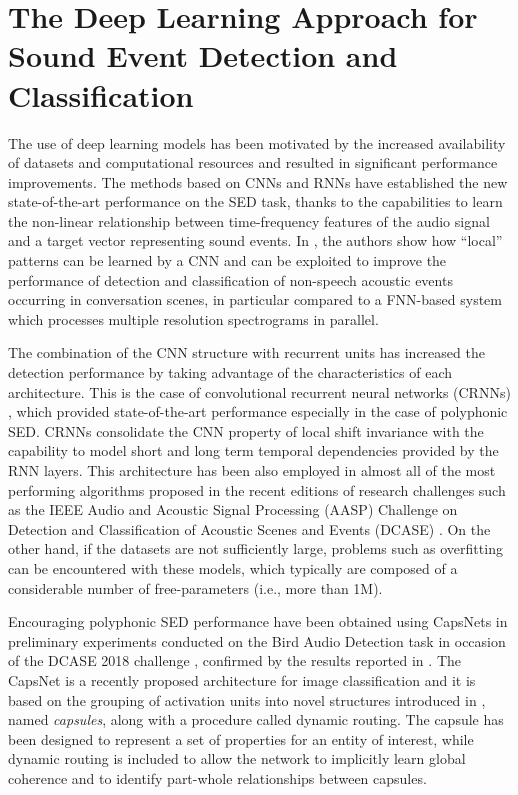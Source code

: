 \section{The Deep Learning Approach for Sound Event Detection and Classification}
The use of deep learning models has been motivated by the increased availability of datasets and computational resources and resulted in significant performance improvements. %
The methods based on CNNs and RNNs have established the new state-of-the-art performance on the SED task, thanks to the capabilities to learn the non-linear relationship between time-frequency features of the audio signal and a target vector representing sound events. In \cite{espi2015}, the authors show how ``local'' patterns can be learned by a CNN and can be exploited to improve the performance of detection and classification of non-speech acoustic events occurring in conversation scenes, in particular compared to a FNN-based system which processes multiple resolution spectrograms in parallel. 

The combination of the CNN structure with recurrent units has increased the detection performance by taking advantage of the characteristics of each architecture. This is the case of convolutional recurrent neural networks (CRNNs) \cite{cakir2017convolutional}, which provided state-of-the-art performance especially in the case of polyphonic SED. CRNNs consolidate the CNN property of local shift invariance with the capability to model short and long term temporal dependencies provided by the RNN layers. This architecture has been also employed in almost all of the most performing algorithms proposed in the recent editions of research challenges such as the IEEE Audio and Acoustic Signal Processing (AASP) Challenge on  Detection and Classification of Acoustic Scenes and Events (DCASE) \cite{DCASE2017Workshop}. On the other hand, if the datasets are not sufficiently large, problems such as overfitting can be encountered with these models, which typically are composed of a considerable number of free-parameters (i.e., more than 1M). 

Encouraging polyphonic SED performance have been obtained using CapsNets in preliminary experiments conducted on the Bird Audio Detection task in occasion of the DCASE 2018 challenge \cite{vesperini2018capsule}, confirmed by the results reported in \cite{iqbal2018capsule}.
The CapsNet \cite{sabour2017dynamic} is a recently proposed architecture for image classification and it is based on the grouping of activation units into novel structures introduced in \cite{hinton2011transforming}, named \textit{capsules}, along with a procedure called dynamic routing. The capsule has been designed to represent a set of properties for an entity of interest, while dynamic routing is included to allow the network to implicitly learn global coherence and to identify part-whole relationships between capsules.

